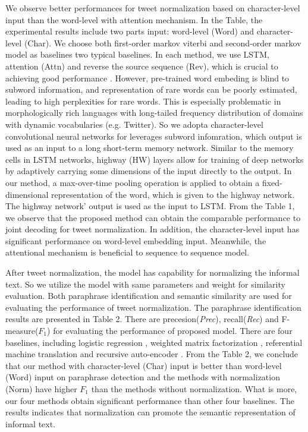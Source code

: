 \documentclass[letterpaper]{article}
\begin{document}
We observe better performances for tweet normalization based on character-level input than the word-level with attention mechanism. In the Table, the experimental results include two parts input: word-level (Word) and character-level (Char). We choose both first-order markov viterbi and second-order markov model as baselines \cite{Li:2015:JPT:2832415.2832425}  two typical baselines. In each method, we use LSTM, attention (Attn) and reverse the source sequence (Rev), which is crucial to achieving good performance \cite{Sutskever:2014:SSL:2969033.2969173}. However, pre-trained word embeding is blind to subword information, and representation of rare words can be poorly estimated, leading to high perplexities for rare words. This is especially problematic in morphologically rich languages with long-tailed frequency distribution of domains with dynamic vocabularies (e.g. Twitter). So we adopta character-level convolutional neural networks for leverages subword infomration, which output is used as an input to a long short-term memory network. Similar to the memory cells in LSTM networks, highway (HW) layers allow for training of deep networks by adaptively carrying some dimensions of the input directly to the output. In our method, a max-over-time pooling operation is applied to obtain a fixed-dimensional representation of the word, which is given to the highway network. The highway network' output is used as the input to LSTM. From the Table 1, we observe that the proposed method can obtain the comparable performance to joint decoding for tweet normalization. In addition, the character-level input has significant performance on word-level embedding input. Meanwhile, the attentional mechanism is beneficial to sequence to sequence model.

After tweet normalization, the model has capability for normalizing the informal text. So we utilize the model with same parameters and weight for similarity evaluation. Both paraphrase identification and semantic similarity are used for evaluating the performance of tweet normalization. The paraphrase identification results are presented in Table 2. There are precesion(\textit{Prec}), recall(\textit{Rec}) and F-measure(\textit{$F_{1}$}) for evaluating the performance of proposed model. There are four baselines, including logistic regression \cite{das-smith:2009:ACLIJCNLP}, weighted matrix factorization \cite{guo-diab:2012:ACL2012}, referential machine translation \cite{bicici:2015:SemEval} and recursive auto-encoder \cite{NIPS2011_4204}. From the Table 2, we conclude that our method with character-level (Char) input is better than word-level (Word) input on paraphrase detection and the methods with normalization (Norm) have higher \textit{$F_{1}$} than the methods without normalization. What is more, our four methods obtain significant performance than other four baselines. The results indicates that normalization can promote the semantic representation of informal text.
\end{document}
